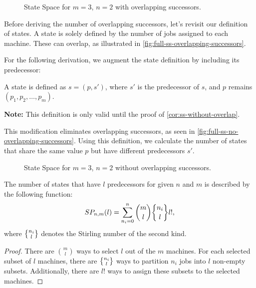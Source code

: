 \begin{figure}
    \centering
    
    \caption{State Space for $m=3$, $n=2$ with overlapping successors.}
    \label{fig:full-ss-overlapping-successors}
\end{figure}

Before deriving the number of overlapping successors, let's revisit our definition of states. A state is solely defined by the number of jobs assigned to each machine. These can overlap, as illustrated in \autoref{fig:full-ss-overlapping-successors}.

For the following derivation, we augment the state definition by including its predecessor:

\begin{definition}
    \label{def:state-with-predecessor}
    A state is defined as $s = (p, s')$, where $s'$ is the predecessor of $s$, and $p$ remains $(p_1, p_2, \dots, p_m)$.

    \textbf{Note:} This definition is only valid until the proof of \autoref{cor:ss-without-overlap}.
\end{definition}

This modification eliminates overlapping successors, as seen in \autoref{fig:full-ss-no-overlapping-successors}. Using this definition, we calculate the number of states that share the same value $p$ but have different predecessors $s'$.

\begin{figure}
    \centering
    
    \caption{State Space for $m=3$, $n=2$ without overlapping successors.}
    \label{fig:full-ss-no-overlapping-successors}
\end{figure}

\begin{proposition}
    \label{prop:sp}
    The number of states that have $l$ predecessors for given $n$ and $m$ is described by the following function:
    \[
        SP_{n,m}(l) = \sum_{n_i=0}^{n} \binom{m}{l} \stirlingS{n_i}{l} l!\text{,}
    \]
    where $\stirlingS{n_i}{l}$ denotes the Stirling number of the second kind.
\end{proposition}

\begin{proof}
    There are $\binom{m}{l}$ ways to select $l$ out of the $m$ machines. For each selected subset of $l$ machines, there are $\stirlingS{n_i}{l}$ ways to partition $n_i$ jobs into $l$ non-empty subsets. Additionally, there are $l!$ ways to assign these subsets to the selected machines.
\end{proof}


